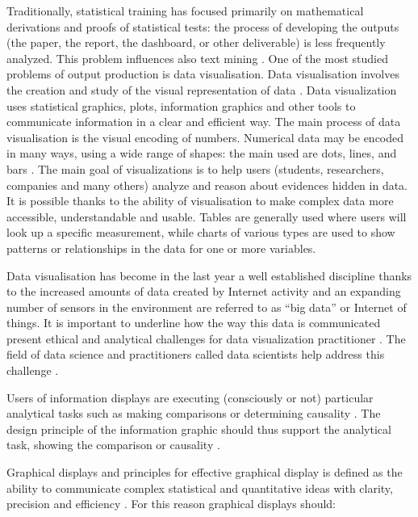 \documentclass[]{book}
\theoremstyle{definition}
\theoremstyle{definition}
\theoremstyle{definition}
\theoremstyle{remark}
\begin{document}
Traditionally, statistical training has focused primarily on
mathematical derivations and proofs of statistical tests: the process of
developing the outputs (the paper, the report, the dashboard, or other
deliverable) is less frequently analyzed. This problem influences also
text mining \citep{parker2017opinionated}. One of the most studied
problems of output production is data visualisation. Data visualisation
involves the creation and study of the visual representation of data
\citep{friendly2001milestones}. Data visualization uses statistical
graphics, plots, information graphics and other tools to communicate
information in a clear and efficient way. The main process of data
visualisation is the visual encoding of numbers. Numerical data may be
encoded in many ways, using a wide range of shapes: the main used are
dots, lines, and bars \citep{wickham2016ggplot2}. The main goal of
visualizations is to help users (students, researchers, companies and
many others) analyze and reason about evidences hidden in data. It is
possible thanks to the ability of visualisation to make complex data
more accessible, understandable and usable. Tables are generally used
where users will look up a specific measurement, while charts of various
types are used to show patterns or relationships in the data for one or
more variables.

Data visualisation has become in the last year a well established
discipline thanks to the increased amounts of data created by Internet
activity and an expanding number of sensors in the environment are
referred to as ``big data'' or Internet of things. It is important to
underline how the way this data is communicated present ethical and
analytical challenges for data visualization practitioner
\citep{bikakis2018big}. The field of data science and practitioners
called data scientists help address this challenge
\citep{loukides2011data}.

Users of information displays are executing (consciously or not)
particular analytical tasks such as making comparisons or determining
causality \citep{tufte1990envisioning}. The design principle of the
information graphic should thus support the analytical task, showing the
comparison or causality \citep{tufte2006beautiful}.

Graphical displays and principles for effective graphical display is
defined as the ability to communicate complex statistical and
quantitative ideas with clarity, precision and efficiency
\citep{mulrow2002visual}. For this reason graphical displays should:
\end{document}

